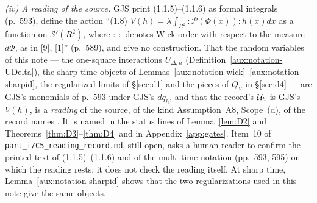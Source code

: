 \begin{auxrem}
\emph{(iv) A reading of the source.}  GJS print (1.1.5)--(1.1.6) as formal integrals (p.~593),
define the action ``(1.8) $V(h)=\lambda\int_{R^2}:\mathscr P(\Phi(x)):h(x)dx$ as a function on
$\mathscr S'(R^2)$, where $:\ :$ denotes Wick order with respect to the measure $d\Phi$, as in
[9], [1]'' (p.~589), and give no construction.  That the random variables of this note --- the
one-square interactions $U_{\Delta,n}$ (Definition~\ref{aux:notation-UDelta}), the sharp-time
objects of Lemmas~\ref{aux:notation-wick}--\ref{aux:notation-sharpid}, the regularized limits of
\S\ref{sec:d1} and the pieces of $Q_V$ in \S\ref{sec:d4} --- are GJS's monomials of p.~593 under
GJS's $dq_h$, and that the record's $\mathcal U_h$ is GJS's $V(h)$, is a \emph{reading} of the source,
of the kind Assumption~A8, Scope~(d), of the record names \cite[p.~13]{R}.  It is named in the
status lines of Lemma~\ref{lem:D2} and Theorems~\ref{thm:D3}--\ref{thm:D4} and in
Appendix~\ref{app:gates}.  Item~10 of \texttt{part\_i/C5\_reading\_record.md}, still open, asks a
human reader to confirm the printed text of (1.1.5)--(1.1.6) and of the multi-time notation
(pp.~593, 595) on which the reading rests; it does not check the reading itself.  At sharp time,
Lemma~\ref{aux:notation-sharpid} shows that the two regularizations used in this note give the
same objects.
\end{auxrem}

